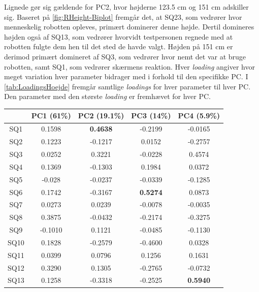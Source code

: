 Lignede gør sig gældende for PC2, hvor højderne 123.5 cm og 151 cm adskiller sig. Baseret på \autoref{fig:RHeight-Biplot} fremgår det, at SQ23, som vedrører hvor menneskelig robotten opleves, primært dominerer denne højde. Dertil domineres højden også af SQ13, som vedrører hvorvidt testpersonen regnede med at robotten fulgte dem hen til det sted de havde valgt. Højden på 151 cm er derimod primært domineret af SQ3, som vedrører hvor nemt det var at bruge robotten, samt SQ1, som vedrører skærmens reaktion. \blankline
%
Hver \textit{loading} angiver hvor meget variation hver parameter bidrager med i forhold til den specifikke PC. I \autoref{tab:LoadingsHoejde} fremgår samtlige \textit{loadings} for hver parameter til hver PC. Den parameter med den største \textit{loading} er fremhævet for hver PC.  
%
\begin{table}[H]
\centering
\begin{tabular}{c|c|c|c|c}
    & PC1 (61\%)      & PC2 (19.1\%)    & PC3 (14\%)      & PC4 (5.9\%)     \\ \hline
SQ1  & 0.1598          & \textbf{0.4638} & -0.2199         & -0.0165         \\ \hline
SQ2  & 0.1223          & -0.1217         & 0.0152          & -0.2757         \\ \hline
SQ3  & 0.0252          & 0.3221          & -0.0228         & 0.4574          \\ \hline
SQ4  & 0.1369          & -0.1303         & 0.1984          & 0.0372          \\ \hline
SQ5  & -0.028          & -0.0237         & -0.0339         & -0.1285         \\ \hline
SQ6  & 0.1742          & -0.3167         & \textbf{0.5274} & 0.0873          \\ \hline
SQ7  & 0.0273          & 0.0239          & -0.0078         & -0.0035         \\ \hline
SQ8  & 0.3875          & -0.0432         & -0.2174         & -0.3275         \\ \hline
SQ9  & -0.1010         & 0.1121          & -0.0485         & -0.1130          \\ \hline
SQ10 & 0.1828          & -0.2579         & -0.4600         & 0.0328          \\ \hline
SQ11 & 0.0399          & 0.0796          & 0.1256          & 0.1631          \\ \hline
SQ12 & 0.3290          & 0.1305          & -0.2765         & -0.0732         \\ \hline
SQ13 & 0.1258          & -0.3318         & -0.2525         & \textbf{0.5940} \\ \hline

\end{tabular}
\end{table}
